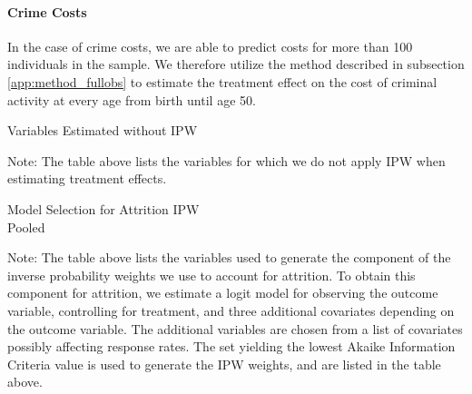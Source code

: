 \paragraph{Crime Costs}

\noindent In the case of crime costs, we are able to predict costs for more than 100 individuals in the
sample. We therefore utilize the method described in subsection \ref{app:method_fullobs}
to estimate the treatment effect on the cost of criminal activity at every age from birth until age 50. \\


\begin{table}[H]
\begin{threeparttable}
\caption{Variables Estimated without IPW}
\label{table:nonipw}
\centering

\begin{tablenotes}
\footnotesize
\item Note: The table above lists the variables for which we do not apply IPW when estimating
treatment effects.
\end{tablenotes}
\end{threeparttable}
\end{table}



\begin{table}
\caption{Model Selection for Attrition IPW \\ Pooled }
\label{table:ms_attrit_pooled}
\centering
\begin{adjustbox}{max width=\textwidth}
\begin{threeparttable}

\begin{tablenotes}
\tiny
\item Note: The table above lists the variables used to generate the component of the
inverse probability weights we use to account for attrition. To obtain this
component for attrition, we estimate a logit model for observing the outcome variable,
controlling for treatment, and three additional covariates depending on the outcome
variable. The additional variables are chosen from a list of covariates possibly affecting
response rates. The set yielding the lowest Akaike Information Criteria value is used to
generate the IPW weights, and are listed in the table above.
\end{tablenotes}
\end{threeparttable}
\end{adjustbox}
\end{table}

